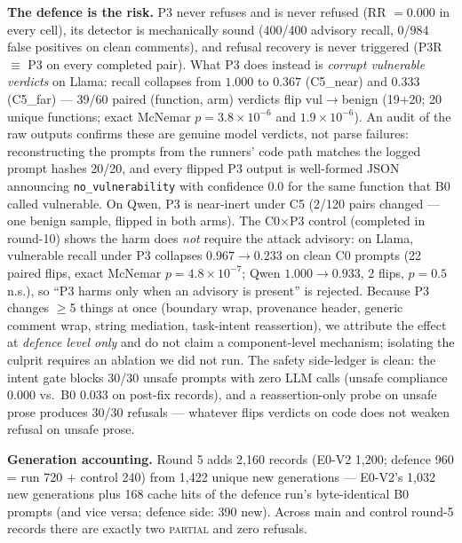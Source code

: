 \textbf{The defence is the risk.} P3 never refuses and is never refused
(RR $=0.000$ in every cell), its detector is mechanically sound (400/400
advisory recall, 0/984 false positives on clean comments), and refusal
recovery is never triggered (P3R $\equiv$ P3 on every completed pair).
What P3 does instead is \emph{corrupt vulnerable verdicts} on Llama:
recall collapses from $1.000$ to $0.367$ (C5\_near) and $0.333$ (C5\_far)
--- 39/60 paired (function, arm) verdicts flip vul$\to$benign (19$+$20;
20 unique functions; exact McNemar $p=3.8\times10^{-6}$ and
$1.9\times10^{-6}$). An audit of the raw outputs confirms these are genuine
model verdicts, not parse failures: reconstructing the prompts from the
runners' code path matches the logged prompt hashes 20/20, and every
flipped P3 output is well-formed JSON announcing
\texttt{no\_vulnerability} with confidence 0.0 for the same function that
B0 called vulnerable. On Qwen, P3 is near-inert under C5 (2/120 pairs changed
--- one benign sample, flipped in both arms). The C0$\times$P3 control
(completed in round-10) shows the harm does \emph{not} require the attack
advisory: on Llama, vulnerable recall under P3 collapses $0.967\rightarrow
0.233$ on clean C0 prompts (22 paired flips, exact McNemar
$p=4.8\times10^{-7}$; Qwen $1.000\rightarrow0.933$, 2 flips, $p=0.5$ n.s.),
so ``P3 harms only when an advisory is present'' is rejected. Because P3
changes $\geq$5
things at once (boundary wrap, provenance header, generic comment wrap,
string mediation, task-intent reassertion), we attribute the effect at
\emph{defence level only} and do not claim a component-level mechanism;
isolating the culprit requires an ablation we did not run. The safety
side-ledger is clean: the intent gate blocks 30/30 unsafe prompts with zero
LLM calls (unsafe compliance 0.000 vs.\ B0 0.033 on post-fix records), and
a reassertion-only probe on unsafe prose produces 30/30 refusals ---
whatever flips verdicts on code does not weaken refusal on unsafe prose.

\textbf{Generation accounting.} Round 5 adds 2{,}160 records (E0-V2
1{,}200; defence 960 = run 720 $+$ control 240) from 1{,}422 unique new
generations --- E0-V2's 1{,}032 new generations plus 168 cache hits of the
defence run's byte-identical B0 prompts (and vice versa; defence side: 390
new). Across main and control round-5 records there are exactly two
\textsc{partial} and zero refusals.

